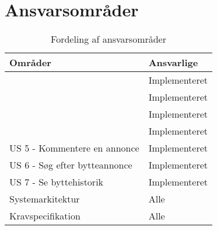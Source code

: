\section{Ansvarsområder}
\begin{table}[H]
	\begin{tabular}{ | l | p{5cm} |}
		\hline
		\textbf{Områder}  & \textbf{Ansvarlige} \\ \hline
		  & Implementeret \\ \hline
		& Implementeret \\ \hline
		 & Implementeret \\ \hline
		 & Implementeret \\ \hline
		US 5 - Kommentere en annonce & Implementeret \\ \hline
		US 6 - Søg efter bytteannonce & Implementeret \\ \hline
		US 7 - Se byttehistorik & Implementeret \\ \hline	
		Systemarkitektur & Alle \\ \hline	
		Kravspecifikation & Alle \\ \hline	
	\end{tabular}
	\caption{Fordeling af ansvarsområder}
	\label{fig:Ansvarstabel}
\end{table}
